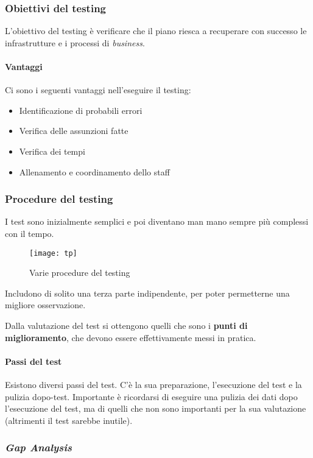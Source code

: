 \subsubsection{Obiettivi del testing}

L'obiettivo del testing è verificare che il piano riesca a recuperare con 
successo le infrastrutture e i processi di \textit{business}.

\paragraph*{Vantaggi} Ci sono i seguenti vantaggi nell'eseguire il testing:
\begin{itemize}
  \item Identificazione di probabili errori
  \item Verifica delle assunzioni fatte
  \item Verifica dei tempi
  \item Allenamento e coordinamento dello staff
\end{itemize}

\subsubsection{Procedure del testing}

I test sono inizialmente semplici e poi diventano man mano sempre più complessi 
con il tempo.

\begin{figure}[H]
 \centering
 \texttt{[image: tp]}
 \caption{Varie procedure del testing}
\end{figure}

Includono di solito una terza parte indipendente, per poter permetterne una 
migliore osservazione.

Dalla valutazione del test si ottengono quelli che sono i \textbf{punti di 
miglioramento}, che devono essere effettivamente messi in pratica.

\paragraph*{Passi del test} Esistono diversi passi del test. C'è la sua 
preparazione, l'esecuzione del test e la pulizia dopo-test. Importante è 
ricordarsi di eseguire una pulizia dei dati dopo l'esecuzione del test, ma di 
quelli che non sono importanti per la sua valutazione (altrimenti il test 
sarebbe inutile).

\subsubsection{\textit{Gap Analysis}}

